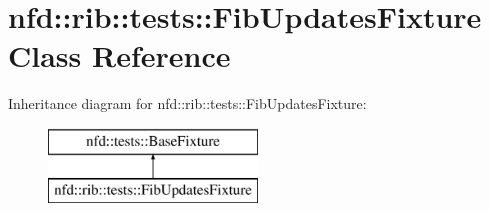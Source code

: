\hypertarget{classnfd_1_1rib_1_1tests_1_1FibUpdatesFixture}{}\section{nfd\+:\+:rib\+:\+:tests\+:\+:Fib\+Updates\+Fixture Class Reference}
\label{classnfd_1_1rib_1_1tests_1_1FibUpdatesFixture}
Inheritance diagram for nfd\+:\+:rib\+:\+:tests\+:\+:Fib\+Updates\+Fixture\+:\begin{figure}[H]
\begin{center}
\leavevmode
\includegraphics[height=2.000000cm]{classnfd_1_1rib_1_1tests_1_1FibUpdatesFixture}
\end{center}
\end{figure}

